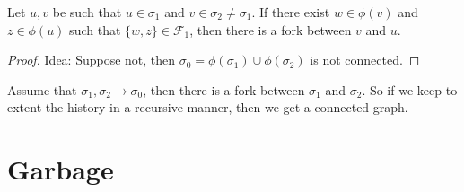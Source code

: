 \begin{definition}[Fork]
Let $u, v$ be such that $u \in \sigma_{1}$ and $v \in \sigma_{2} \neq \sigma_{1}$. If there exist $w \in \phi(v)$ and $z \in \phi(u)$ such that $\{w, z\} \in \mathcal{F}_{1}$, then there is a fork between $v$ and $u$.
\end{definition}
\begin{proof}
  Idea: Suppose not, then $\sigma_{0} = \phi(\sigma_{1}) \cup \phi(\sigma_{2}) $ is not connected.  
\end{proof}
\begin{claim}
Assume that $\sigma_{1}, \sigma_{2} \rightarrow \sigma_{0}$, then there is a fork between $\sigma_{1}$ and $\sigma_{2}$. So if we keep to extent the history in a recursive manner, then we get a connected graph.
\end{claim}

\section{Garbage} 

